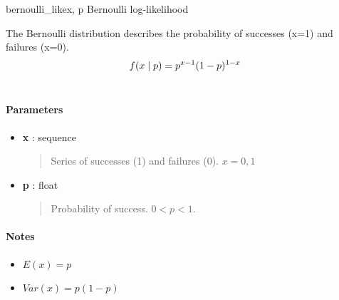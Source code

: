 \hypertarget{pymc.distributions.bernoulli_like}{}\begin{funcdesc}{bernoulli\_like}{x, p}
Bernoulli log-likelihood

The Bernoulli distribution describes the probability of successes (x=1) and
failures (x=0).
\begin{gather}
\begin{split}f(x \mid p) = p^{x- 1} (1-p)^{1-x}\end{split}\notag\\\begin{split}\end{split}\notag
\end{gather}
\paragraph{Parameters}
\begin{itemize}
\item[] \textbf{x} : sequence
\begin{quote}

Series of successes (1) and failures (0). $x=0,1$
\end{quote}

\item[] \textbf{p} : float
\begin{quote}

Probability of success. $0 < p < 1$.
\end{quote}
\end{itemize}
\paragraph{Notes}
\begin{itemize}
\item {} 
$E(x)= p$

\item {} 
$Var(x)= p(1-p)$

\end{itemize}

\end{funcdesc}

